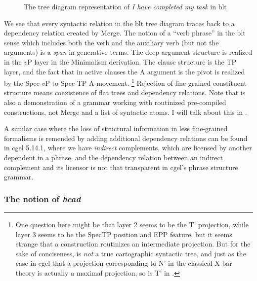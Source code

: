 \documentclass[../main.tex]{subfiles}
\begin{document}
\begin{figure}
    \centering
    
    \caption{The tree diagram representation of \emph{I have completed my task} in \ac{blt}}
    \label{fig:complete-my-task-blt-1}
\end{figure}

We see that every syntactic relation in the \ac{blt} tree diagram traces back to a dependency relation created 
by Merge. The notion of a ``verb phrase'' in the \ac{blt} sense which includes both the verb and the auxiliary 
verb (but not the arguments) is a \emph{span} in generative terms. The deep argument structure is realized 
in the $v$P layer in the Minimalism derivation. The clause structure is the TP layer, and the fact that 
in active clauses the A argument is the pivot is realized by the Spec-$v$P to Spec-TP A-movement.%
\footnote{One question here might be that layer 2 seems to be the T' projection, while layer 3 seems to be 
the SpecTP position and EPP feature, but it seems strange that a construction routinizes an intermediate
projection. But for the sake of conciseness,  is \emph{not} 
a true cartographic syntactic tree, and just as the case in \ac{cgel} that a projection corresponding to 
N' in the classical X-bar theory is actually a maximal projection, so is T' in .}
Rejection of fine-grained constituent structure means coexistence of flat trees and dependency relations.
Note that  is also a demonstration of a grammar working with 
routinized pre-compiled constructions, not Merge and a list of syntactic atoms. I will 
talk about this in . %

A similar case where the loss of structural information in less fine-grained formalisms
is remended by adding additional dependency relations can be found in \ac{cgel} 5.14.1, where 
we have \emph{indirect} complements, which are licensed by another dependent in a phrase, 
and the dependency relation between an indirect complement and its licensor is not that 
transparent in \ac{cgel}'s phrase structure grammar.

\subsubsection{The notion of \emph{head}}\label{sec:headedness}
\end{document}
